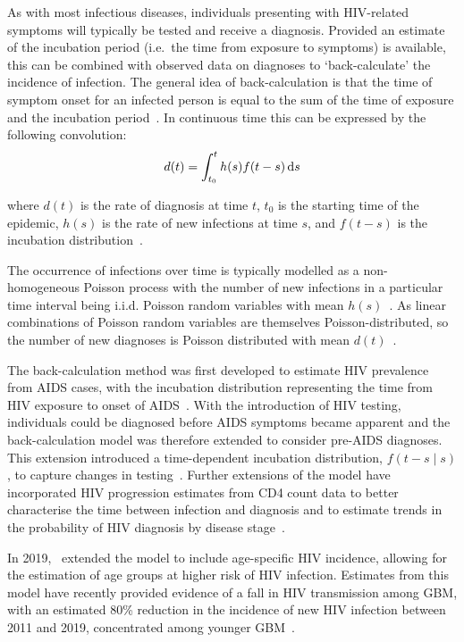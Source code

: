 As with most infectious diseases, individuals presenting with HIV-related symptoms will typically be tested and receive a diagnosis. Provided an estimate of the incubation period (i.e.\ the time from exposure to symptoms) is available, this can be combined with observed data on diagnoses to `back-calculate' the incidence of infection. The general idea of back-calculation is that the time of symptom onset for an infected person is equal to the sum of the time of exposure and the incubation period~\parencite{Egan2015-oi}. In continuous time this can be expressed by the following convolution:
%
\[
  d(t) = \int_{t_0}^t{h(s)f(t-s) \mathop{}\!\mathrm{d} s}
\]

where $d(t)$ is the rate of diagnosis at time $t$, $t_0$ is the starting time of the epidemic, $h(s)$ is the rate of new infections at time $s$, and $f(t-s)$ is the incubation distribution~\parencite{Brookmeyer1994-nr}.

The occurrence of infections over time is typically modelled as a non-homogeneous Poisson process with the number of new infections in a particular time interval being i.i.d. Poisson random variables with mean $h(s)$~\parencite{Becker1991-wj, Rosenberg1991-by}. As linear combinations of Poisson random variables are themselves Poisson-distributed, so the number of new diagnoses is Poisson distributed with mean $d(t)$~\parencite{Chiang1980-yt}.

The back-calculation method was first developed to estimate HIV prevalence from AIDS cases, with the incubation distribution representing the time from HIV exposure to onset of AIDS~\parencite{Brookmeyer1988-va}. With the introduction of HIV testing, individuals could be diagnosed before AIDS symptoms became apparent and the back-calculation model was therefore extended to consider pre-AIDS diagnoses. This extension introduced a time-dependent incubation distribution, $f(t-s \mid s)$, to capture changes in testing~\parencite{Aalen1997-jh}. Further extensions of the model have incorporated HIV progression estimates from CD4 count data to better characterise the time between infection and diagnosis and to estimate trends in the probability of HIV diagnosis by disease stage~\parencite{Birrell2012-hw, Sweeting2005-sj, van-Sighem2015-zo}.

In 2019,~\cite{Brizzi2019-yj} extended the model to include age-specific HIV incidence, allowing for the estimation of age groups at higher risk of HIV infection. Estimates from this model have recently provided evidence of a fall in HIV transmission among GBM, with an estimated 80\% reduction in the incidence of new HIV infection between 2011 and 2019, concentrated among younger GBM~\parencite{Brizzi2021-zl}.

